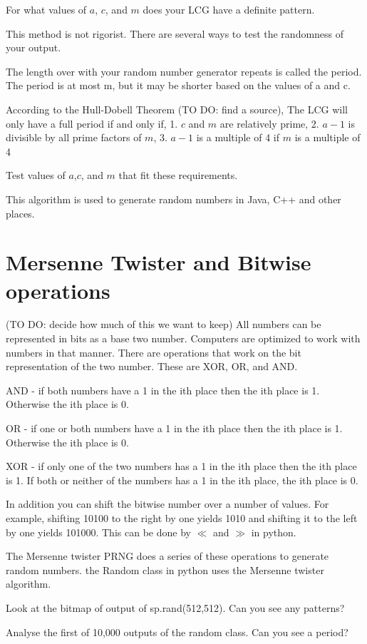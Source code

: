 \begin{problem}
For what values of $a$, $c$, and $m$ does your LCG have a definite pattern.
\end{problem}

This method is not rigorist. There are several ways to test the randomness of your output. 

The length over with your random number generator repeats is called the period. The period is at most m, but it may be shorter based on the values of a and c.
 
According to the Hull-Dobell Theorem (TO DO: find a source), The LCG will only have a full period if and only if, 
1. $c$ and $m$ are relatively prime,
2. $a-1$ is divisible by all prime factors of $m$,
3. $a-1$ is a multiple of 4 if $m$ is a multiple of 4

\begin{problem}
Test values of $a$,$c$, and $m$ that fit these requirements. 
\end{problem}

This algorithm is used to generate random numbers in Java, C++ and other places.

\section*{Mersenne Twister and Bitwise operations}


(TO DO: decide how much of  this we want to keep) All numbers can be represented in bits as a base two number. Computers are optimized to work with numbers in that manner. There are operations that work on the bit representation of the two number. These are XOR, OR, and AND. 

AND - if both numbers have a 1 in the ith place then the ith place is 1. Otherwise the ith place is 0.

OR - if one or both numbers have a 1 in the ith place then the ith place is 1. Otherwise the ith place is 0.

XOR - if only one of the two numbers has a 1 in the ith place then the ith place is 1. If both or neither of the numbers has a 1 in the ith place, the ith place is 0.

In addition you can shift the bitwise number over a number of values. For example, shifting 10100 to the right by one yields 1010 and shifting it to the left by one yields 101000. This can be done by $\ll$ and $\gg$ in python. 


The Mersenne twister PRNG does a series of these operations to generate random numbers. the Random class in python uses the Mersenne twister algorithm. 

\begin{problem}
Look at the bitmap of output of sp.rand(512,512). Can you see any patterns?
\end{problem}

\begin{problem}
Analyse the first of 10,000 outputs of the random class. Can you see a period?
\end{problem}
